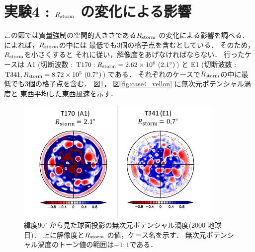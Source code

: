 \documentclass[a4j,12pt,openbib,oneside]{jreport}
\begin{document}
\section{実験4 : $R_{\rm{storm}}$ の変化による影響}
\label{sec:case4}
この節では質量強制の空間的大きさである$R_{\rm{storm}}$ の変化による影響を調べる．
\cite{Showman2007} によれば，$R_{\rm{storm}}$の中には
最低でも3個の格子点を含むとしている．
そのため，$R_{\rm{storm}}$を小さくすると
それに従い，解像度をあげなければならない．
行ったケースは
A1 (切断波数 : ${\rm{T170}} : R_{\rm{storm}} = 2.62 \times 10^6 ~(2.1^\circ)$) と
E1 (切断波数 : ${\rm{T341}}, R_{\rm{storm}} = 8.72 \times 10^5 ~(0.7^\circ)$) である．
それぞれのケースで$R_{\rm{storm}}$の中に最低でも3個の格子点を含む．
図\ref{fig:case4_nonqv}， 図\ref{fig:case4_vellon} に無次元ポテンシャル渦度と
東西平均した東西風速を示す．
%
%
%
%
%
\begin{figure}[ht]
  \begin{center}
    \includegraphics[clip,width=10cm]{./fig/result/case4/case4_nonqv.png}
    \caption{
      \footnotesize{緯度$90^\circ$ から見た球面投影の無次元ポテンシャル渦度(2000 地球日)．
上に解像度と$R_{\rm{storm}}$ の値，ケース名を示す．
無次元ポテンシャル渦度のトーン値の範囲は$-1:1$である．
      }
    }
    \label{fig:case4_nonqv}
  \end{center}
\end{figure}
\end{document}
